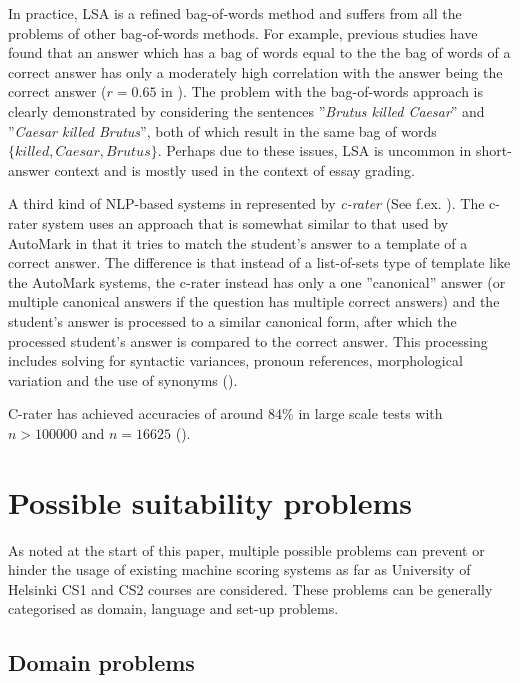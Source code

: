 \documentclass[english]{tktltiki2}
\theoremstyle{definition}
\theoremstyle{remark}
\begin{document}
In practice, LSA is a refined bag-of-words method and suffers from all the problems of other bag-of-words methods. For example, previous studies have found that an answer which has a bag of words equal to the the bag of words of a correct answer has only a moderately high correlation with the answer being the correct answer ($r = 0.65$ in \cite{shermis15}). The problem with the bag-of-words approach is clearly demonstrated by considering the sentences ''\emph{Brutus killed Caesar}'' and ''\emph{Caesar killed Brutus}'', both of which result in the same bag of words $\{killed, Caesar, Brutus\}$. Perhaps due to these issues, LSA is uncommon in short-answer context and is mostly used in the context of essay grading.

A third kind of NLP-based systems in represented by \emph{c-rater} (See f.ex. \cite{sukkarieh09, leacock03, shermis15}). The c-rater system uses an approach that is somewhat similar to that used by AutoMark in that it tries to match the student's answer to a template of a correct answer. The difference is that instead of a list-of-sets type of template like the AutoMark systems, the c-rater instead has only a one ''canonical'' answer (or multiple canonical answers if the question has multiple correct answers) and the student's answer is processed to a similar canonical form, after which the processed student's answer is compared to the correct answer. This processing includes solving for syntactic variances, pronoun references, morphological variation and the use of synonyms (\cite{leacock03}).

C-rater has achieved accuracies of around $84\%$ in large scale tests with $n > 100 000$ and $n = 16625$ (\cite{leacock03}). 

\section{Possible suitability problems}
\label{sec:problems}

As noted at the start of this paper, multiple possible problems can prevent or hinder the usage of existing machine scoring systems as far as University of Helsinki CS1 and CS2 courses are considered. These problems can be generally categorised as domain, language and set-up problems. 

\subsection{Domain problems}
\label{sec:domain-problems}
\end{document}
